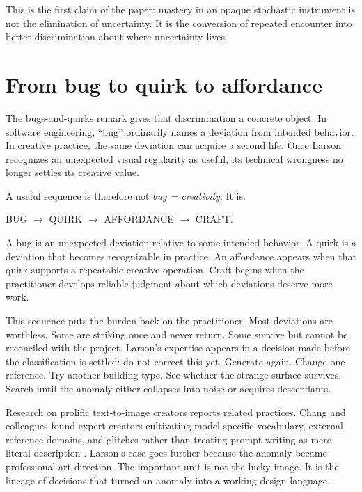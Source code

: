 \documentclass[11pt]{article}
\begin{document}
This is the first claim of the paper: mastery in an opaque stochastic instrument is not the elimination of uncertainty. It is the conversion of repeated encounter into better discrimination about where uncertainty lives.

\section{From bug to quirk to affordance}
The bugs-and-quirks remark gives that discrimination a concrete object. In software engineering, ``bug'' ordinarily names a deviation from intended behavior. In creative practice, the same deviation can acquire a second life. Once Larson recognizes an unexpected visual regularity as useful, its technical wrongness no longer settles its creative value.

A useful sequence is therefore not \emph{bug = creativity}. It is:

\begin{center}
BUG $\rightarrow$ QUIRK $\rightarrow$ AFFORDANCE $\rightarrow$ CRAFT.
\end{center}

A bug is an unexpected deviation relative to some intended behavior. A quirk is a deviation that becomes recognizable in practice. An affordance appears when that quirk supports a repeatable creative operation. Craft begins when the practitioner develops reliable judgment about which deviations deserve more work.

This sequence puts the burden back on the practitioner. Most deviations are worthless. Some are striking once and never return. Some survive but cannot be reconciled with the project. Larson's expertise appears in a decision made before the classification is settled: do not correct this yet. Generate again. Change one reference. Try another building type. See whether the strange surface survives. Search until the anomaly either collapses into noise or acquires descendants.

Research on prolific text-to-image creators reports related practices. Chang and colleagues found expert creators cultivating model-specific vocabulary, external reference domains, and glitches rather than treating prompt writing as mere literal description \cite{ChangEtAl2023PromptArtists}. Larson's case goes further because the anomaly became professional art direction. The important unit is not the lucky image. It is the lineage of decisions that turned an anomaly into a working design language.
\end{document}
